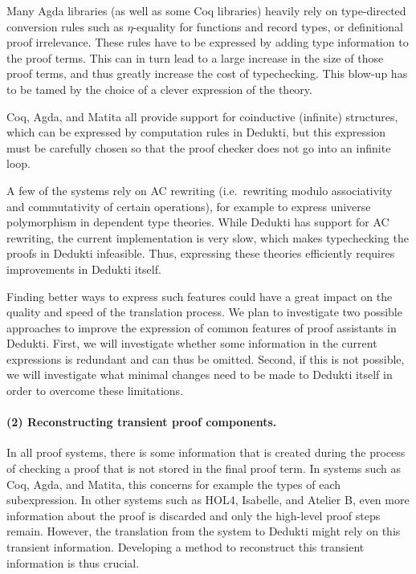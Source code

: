 \begin{compactitem}
\item Many Agda libraries (as well as some Coq libraries) heavily rely
  on type-directed conversion rules such as $\eta$-equality for functions
  and record types, or definitional proof irrelevance. These rules
  have to be expressed by adding type information to the
  proof terms. This can in turn lead to a large increase in the size of
  those proof terms, and thus greatly increase the cost of
  typechecking. This blow-up has to be tamed by the choice of a
  clever expression of the theory.

\item Coq, Agda, and Matita all provide support for coinductive
  (infinite) structures, which can be expressed by computation rules in
  Dedukti, but this expression must be carefully chosen so that the
  proof checker does not go into an infinite loop.

\item A few of the systems rely on AC rewriting (i.e.~rewriting modulo
  associativity and commutativity of certain operations), for example
  to express universe polymorphism in dependent type theories. While
  Dedukti has support for AC rewriting, the current implementation is
  very slow, which makes typechecking the proofs in Dedukti
  infeasible. Thus, expressing these theories efficiently requires improvements in
  Dedukti itself.
\end{compactitem}

Finding better ways to express such features could have a great impact
on the quality and speed of the translation process.  We plan to
investigate two possible approaches to improve the expression of
common features of proof assistants in Dedukti. First, we will
investigate whether some information in the current expressions is
redundant and can thus be omitted. Second, if this is not possible, we
will investigate what minimal changes need to be made to Dedukti
itself in order to overcome these limitations.

\paragraph*{(2) Reconstructing transient proof components.}
In all proof systems, there is some information that is created during
the process of checking a proof that is not stored in the final proof
term. In systems such as Coq, Agda, and Matita, this concerns for
example the types of each subexpression. In other systems such as
HOL4, Isabelle, and Atelier B, even more information about the proof
is discarded and only the high-level proof steps remain.  However, the
translation from the system to Dedukti might rely on this transient
information. Developing a method to reconstruct this transient
information is thus crucial.

